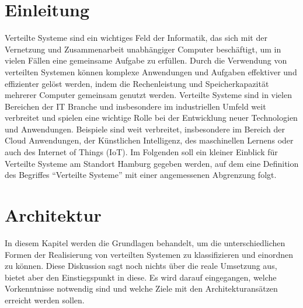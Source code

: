 \documentclass[a4paper]{article}
\begin{document}
\tableofcontents
\newpage

\newpage
\section{Einleitung}
Verteilte Systeme sind ein wichtiges Feld der Informatik, das sich mit der Vernetzung und Zusammenarbeit unabhängiger Computer beschäftigt, um in vielen Fällen eine gemeinsame Aufgabe zu erfüllen. Durch die Verwendung von verteilten Systemen können komplexe Anwendungen und Aufgaben effektiver und effizienter gelöst werden, indem die Rechenleistung und Speicherkapazität mehrerer Computer gemeinsam genutzt werden. Verteilte Systeme sind in vielen Bereichen der IT Branche und insbesondere im industriellen Umfeld weit verbreitet und spielen eine wichtige Rolle bei der Entwicklung neuer Technologien und Anwendungen. Beispiele sind weit verbreitet, insbesondere im Bereich der Cloud Anwendungen, der Künstlichen Intelligenz, des maschinellen Lernens oder auch des Internet of Things (IoT). Im Folgenden soll ein kleiner Einblick für Verteilte Systeme am Standort Hamburg gegeben werden, auf dem eine Definition des Begriffes \enquote{Verteilte Systeme}  mit einer angemessenen Abgrenzung folgt.





\newpage
\newpage
\section{Architektur}
In diesem Kapitel werden die Grundlagen behandelt, um die unterschiedlichen Formen der Realisierung von verteilten Systemen zu klassifizieren und einordnen zu können. Diese Diskussion sagt noch nichts über die reale Umsetzung aus, bietet aber den Einstiegspunkt in diese. Es wird darauf eingegangen, welche Vorkenntnisse notwendig sind und welche Ziele mit den Architekturansätzen erreicht werden sollen.





\end{document}
